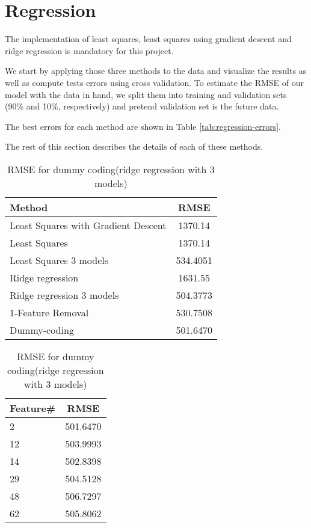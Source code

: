 \documentclass{article} %
\begin{document}
\section{Regression}
The implementation of least squares, least squares using gradient descent and ridge regression is mandatory for this project.

We start by applying those three methods to the data and visualize the results as well as compute tests errors using cross validation.
To  estimate the RMSE of our model with the data in hand, we split them into training and validation sets (90\% and 10\%, respectively) and pretend validation set is the future data. 

The best errors for each method are shown in Table \ref{tab:regression-errors}.

The rest of this section describes the details of each of these methods.

\begin{table}[!htb]
	\begin{minipage}{.5\linewidth}
		\centering

	\begin{center}
		\begin{tabular}{l|c}
			Method & RMSE  \\
			\hline
			Least Squares with Gradient Descent & 1370.14   \\
			Least Squares & 1370.14 \\
			Least Squares 3 models & 534.4051\\
			Ridge regression &  1631.55 \\
			Ridge regression 3 models &  504.3773 \\
			1-Feature Removal & 530.7508 \\
			Dummy-coding &  501.6470 \\
		\end{tabular}
		\caption{The best errors for the regression methods tried.}
		\label{tab:regression-errors}
	\end{center}

	\end{minipage}
	\begin{minipage}{.5\linewidth}
		\centering
		
	\begin{center}
		\begin{tabular}{l|c}
			Feature\# & RMSE  \\
			\hline 
			2 &  501.6470 \\
			12 & 503.9993\\
			14 &  502.8398 \\
			29 &  504.5128 \\
			48 &  506.7297 \\
			62 &  505.8062 
		\end{tabular}
		\caption{RMSE for dummy coding(ridge regression with 3 models)}
		\label{tab:regression-dummy}
	\end{center}
	
	\end{minipage} 
\end{table}
\end{document}
